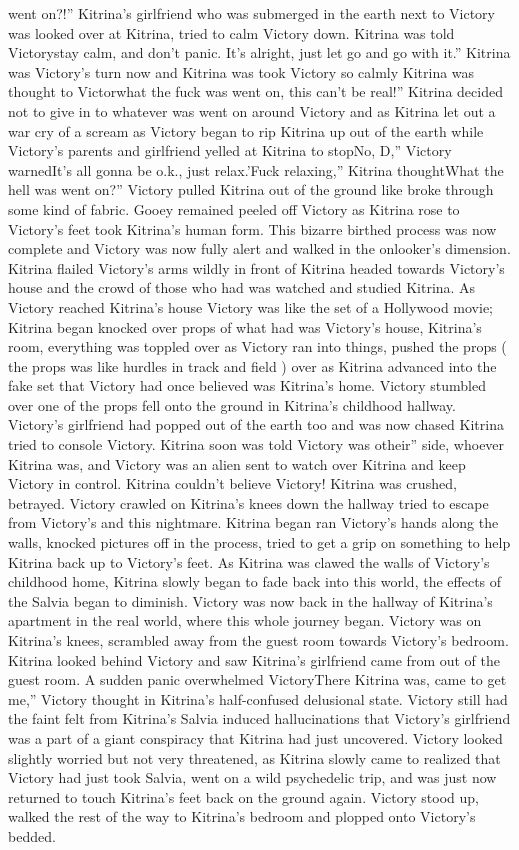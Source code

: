 \documentclass[12pt]{book}
\begin{document}
went on?!'' Kitrina's girlfriend who was submerged in the earth next to Victory was looked over at Kitrina, tried to calm Victory down. Kitrina was told Victorystay calm, and don't panic. It's alright, just let go and go with it.'' Kitrina was Victory's turn now and Kitrina was took Victory so calmly Kitrina was thought to Victorwhat the fuck was went on, this can't be real!'' Kitrina decided not to give in to whatever was went on around Victory and as Kitrina let out a war cry of a scream as Victory began to rip Kitrina up out of the earth while Victory's parents and girlfriend yelled at Kitrina to stopNo, D,'' Victory warnedIt's all gonna be o.k., just relax.'Fuck relaxing,'' Kitrina thoughtWhat the hell was went on?'' Victory pulled Kitrina out of the ground like broke through some kind of fabric. Gooey remained peeled off Victory as Kitrina rose to Victory's feet took Kitrina's human form. This bizarre birthed process was now complete and Victory was now fully alert and walked in the onlooker's dimension. Kitrina flailed Victory's arms wildly in front of Kitrina headed towards Victory's house and the crowd of those who had was watched and studied Kitrina. As Victory reached Kitrina's house Victory was like the set of a Hollywood movie; Kitrina began knocked over props of what had was Victory's house, Kitrina's room, everything was toppled over as Victory ran into things, pushed the props ( the props was like hurdles in track and field ) over as Kitrina advanced into the fake set that Victory had once believed was Kitrina's home. Victory stumbled over one of the props fell onto the ground in Kitrina's childhood hallway. Victory's girlfriend had popped out of the earth too and was now chased Kitrina tried to console Victory. Kitrina soon was told Victory was otheir'' side, whoever Kitrina was, and Victory was an alien sent to watch over Kitrina and keep Victory in control. Kitrina couldn't believe Victory! Kitrina was crushed, betrayed. Victory crawled on Kitrina's knees down the hallway tried to escape from Victory's and this nightmare. Kitrina began ran Victory's hands along the walls, knocked pictures off in the process, tried to get a grip on something to help Kitrina back up to Victory's feet. As Kitrina was clawed the walls of Victory's childhood home, Kitrina slowly began to fade back into this world, the effects of the Salvia began to diminish. Victory was now back in the hallway of Kitrina's apartment in the real world, where this whole journey began. Victory was on Kitrina's knees, scrambled away from the guest room towards Victory's bedroom. Kitrina looked behind Victory and saw Kitrina's girlfriend came from out of the guest room. A sudden panic overwhelmed VictoryThere Kitrina was, came to get me,'' Victory thought in Kitrina's half-confused delusional state. Victory still had the faint felt from Kitrina's Salvia induced hallucinations that Victory's girlfriend was a part of a giant conspiracy that Kitrina had just uncovered. Victory looked slightly worried but not very threatened, as Kitrina slowly came to realized that Victory had just took Salvia, went on a wild psychedelic trip, and was just now returned to touch Kitrina's feet back on the ground again. Victory stood up, walked the rest of the way to Kitrina's bedroom and plopped onto Victory's bedded. 
\end{document}
